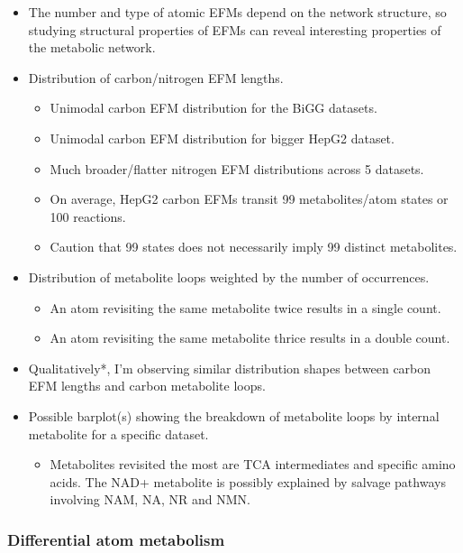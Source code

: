 \documentclass[11pt]{article}
\begin{document}
\begin{itemize}
    \item The number and type of atomic EFMs depend on the network structure, so studying structural properties of EFMs can reveal interesting properties of the metabolic network.
    \item Distribution of carbon/nitrogen EFM lengths.
    \begin{itemize}
        \item Unimodal carbon EFM distribution for the BiGG datasets.
        \item Unimodal carbon EFM distribution for bigger HepG2 dataset.
        \item Much broader/flatter nitrogen EFM distributions across 5 datasets.
        \item On average, HepG2 carbon EFMs transit 99 metabolites/atom states or 100 reactions.
        \item Caution that 99 states does not necessarily imply 99 distinct metabolites.
    \end{itemize}
    \item Distribution of metabolite loops weighted by the number of occurrences.
    \begin{itemize}
        \item An atom revisiting the same metabolite twice results in a single count.
        \item An atom revisiting the same metabolite thrice results in a double count.
    \end{itemize}
    \item Qualitatively*, I'm observing similar distribution shapes between carbon EFM lengths and carbon metabolite loops.
    \item Possible barplot(s) showing the breakdown of metabolite loops by internal metabolite for a specific dataset.
    \begin{itemize}
        \item Metabolites revisited the most are TCA intermediates and specific amino acids. The NAD+ metabolite is possibly explained by salvage pathways involving NAM, NA, NR and NMN.
    \end{itemize}
\end{itemize}


\subsubsection{Differential atom metabolism}
\end{document}
